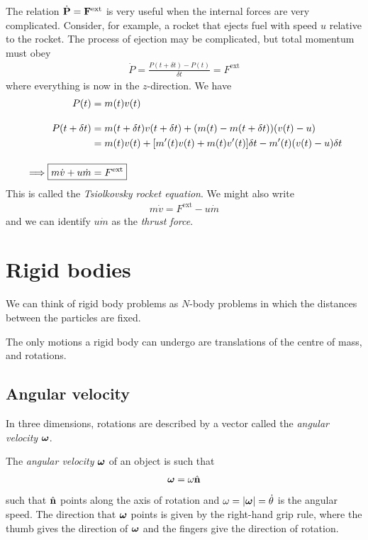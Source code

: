 \documentclass{../../template/note}
\begin{document}
    The relation \(\dot{\V P} = \V F^\text{ext}\) is very useful when the internal forces are very complicated. Consider, for example, a rocket that ejects fuel with speed \(u\) relative to the rocket. The process of ejection may be complicated, but total momentum must obey
    \begin{align*}
        \dot P = \frac{P(t + \delta t) - P(t)}{\delta t} = F^\text{ext}
    \end{align*}
    where everything is now in the \(z\)-direction. We have
    \begin{align*}
        P(t) &= m(t)v(t) \\[10pt]
        P(t + \delta t) &= m(t + \delta t)v(t + \delta t) + (m(t) - m(t + \delta t))(v(t) - u) \\
        &= m(t)v(t) + [m'(t)v(t) + m(t)v'(t)] \delta t - m'(t)(v(t)-u) \delta t \\[10pt]
        \implies \Aboxed{m \dot v + u \dot m &= F^\text{ext}}
    \end{align*}
    This is called the \emph{Tsiolkovsky rocket equation}. We might also write
    \begin{align*}
        m \dot v = F^\text{ext} - u \dot m
    \end{align*}
    and we can identify \(u \dot m\) as the \emph{thrust force}.
    
    \section{Rigid bodies}
    
    We can think of rigid body problems as \(N\)-body problems in which the distances between the particles are fixed.

    The only motions a rigid body can undergo are translations of the centre of mass, and rotations.

    \subsection{Angular velocity}

    In three dimensions, rotations are described by a vector called the \emph{angular velocity} \(\V \omega\).

    \begin{definition}
        The \emph{angular velocity} \(\V \omega\) of an object is such that
        \begin{align*}
            \V \omega = \omega \hvec n
        \end{align*}
        such that \(\hvec n\) points along the axis of rotation and \(\omega = |\V \omega| = \dot \theta\) is the angular speed. The direction that \(\V \omega\) points is given by the right-hand grip rule, where the thumb gives the direction of \(\V \omega\) and the fingers give the direction of rotation. 
    \end{definition}
    
\end{document}
